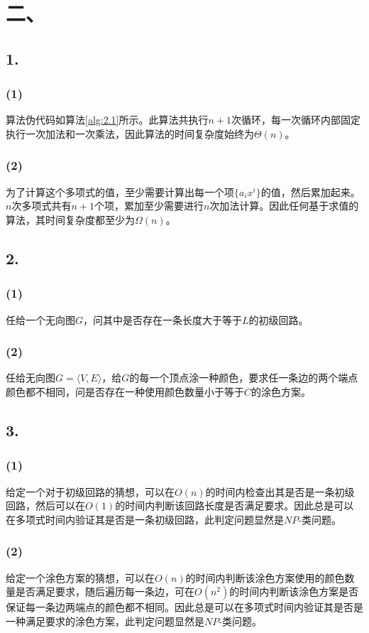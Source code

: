 \documentclass[a4paper]{article}
\begin{document}
\section*{二、}
\subsection*{1.}
\subsubsection*{(1)}

算法伪代码如算法\ref{alg:2.1}所示。此算法共执行$n+1$次循环，每一次循环内部固定执行一次加法和一次乘法，因此算法的时间复杂度始终为$\Theta(n)$。
\subsubsection*{(2)}
为了计算这个多项式的值，至少需要计算出每一个项$\{a_ix^i\}$的值，然后累加起来。$n$次多项式共有$n+1$个项，累加至少需要进行$n$次加法计算。因此任何基于求值的算法，其时间复杂度都至少为$\Omega(n)$。

\subsection*{2.}
\subsubsection*{(1)}
任给一个无向图$G$，问其中是否存在一条长度大于等于$L$的初级回路。
\subsubsection*{(2)}
任给无向图$G=\langle V, E \rangle$，给$G$的每一个顶点涂一种颜色，要求任一条边的两个端点颜色都不相同，问是否存在一种使用颜色数量小于等于$C$的涂色方案。

\subsection*{3.}
\subsubsection*{(1)}
给定一个对于初级回路的猜想，可以在$O(n)$的时间内检查出其是否是一条初级回路，然后可以在$O(1)$的时间内判断该回路长度是否满足要求。因此总是可以在多项式时间内验证其是否是一条初级回路，此判定问题显然是$NP$-类问题。
\subsubsection*{(2)}
给定一个涂色方案的猜想，可以在$O(n)$的时间内判断该涂色方案使用的颜色数量是否满足要求，随后遍历每一条边，可在$O(n^2)$的时间内判断该涂色方案是否保证每一条边两端点的颜色都不相同。因此总是可以在多项式时间内验证其是否是一种满足要求的涂色方案，此判定问题显然是$NP$-类问题。
\end{document}
